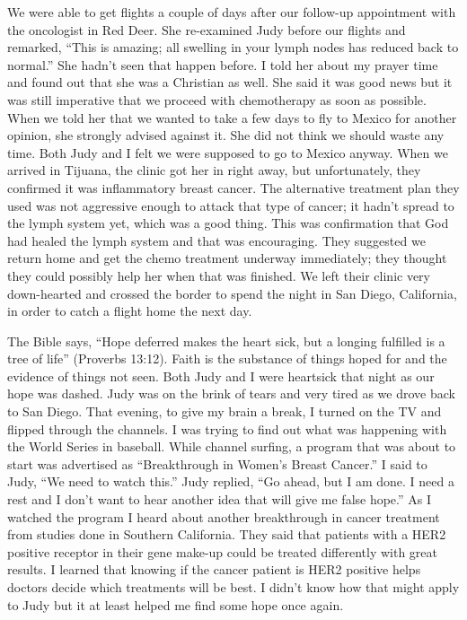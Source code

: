 \documentclass[oneside]{book}
\begin{document}
We were able to get flights a couple of days after our follow-up appointment with the oncologist in Red Deer. She re-examined Judy before our flights and remarked, “This is amazing; all swelling in your lymph nodes has reduced back to normal.” She hadn’t seen that happen before. I told her about my prayer time and found out that she was a Christian as well. She said it was good news but it was still imperative that we proceed with chemotherapy as soon as possible. When we told her that we wanted to take a few days to fly to Mexico for another opinion, she strongly advised against it. She did not think we should waste any time. Both Judy and I felt we were supposed to go to Mexico anyway. When we arrived in Tijuana, the clinic got her in right away, but unfortunately, they confirmed it was inflammatory breast cancer. The alternative treatment plan they used was not aggressive enough to attack that type of cancer; it hadn’t spread to the lymph system yet, which was a good thing. This was confirmation that God had healed the lymph system and that was encouraging. They suggested we return home and get the chemo treatment underway immediately; they thought they could possibly help her when that was finished. We left their clinic very down-hearted and crossed the border to spend the night in San Diego, California, in order to catch a flight home the next day. 

The Bible says, “Hope deferred makes the heart sick, but a longing fulfilled is a tree of life” (Proverbs 13:12). Faith is the substance of things hoped for and the evidence of things not seen. Both Judy and I were heartsick that night as our hope was dashed. Judy was on the brink of tears and very tired as we drove back to San Diego. That evening, to give my brain a break, I turned on the TV and flipped through the channels. I was trying to find out what was happening with the World Series in baseball. While channel surfing, a program that was about to start was advertised as “Breakthrough in Women’s Breast Cancer.” I said to Judy, “We need to watch this.” Judy replied, “Go ahead, but I am done. I need a rest and I don’t want to hear another idea that will give me false hope.”  As I watched the program I heard about another breakthrough in cancer treatment from studies done in Southern California. They said that patients with a HER2 positive receptor in their gene make-up could be treated differently with great results. I learned that knowing if the cancer patient is HER2 positive helps doctors decide which treatments will be best. I didn’t know how that might apply to Judy but it at least helped me find some hope once again.
\end{document}
